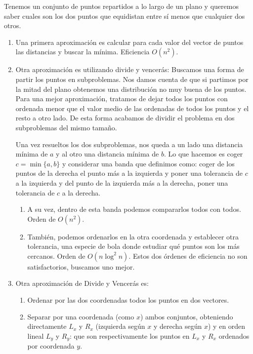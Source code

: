 \begin{ejercicio*}
    Tenemos un conjunto de puntos repartidos a lo largo de un plano y queremos saber cuales son los dos puntos que equidistan entre sí menos que cualquier dos otros.

    \begin{enumerate}
        \item Una primera aproximación es calcular para cada valor del vector de puntos las distancias y buscar la mínima. Eficiencia $O(n^2)$.
        \item Otra aproximación es utilizando divide y vencerás: Buscamos una forma de partir los puntos en subproblemas. Nos damos cuenta de que si partimos por la mitad del plano obtenemos una distribución no muy buena de los puntos. Para una mejor aproximación, tratamos de dejar todos los puntos con ordenada menor que el valor medio de las ordenadas de todos los puntos y el resto a otro lado. De esta forma acabamos de dividir el problema en dos subproblemas del mismo tamaño. 

            Una vez resueltos los dos subproblemas, nos queda a un lado una distancia mínima de $a$ y al otro una distancia mínima de $b$. Lo que hacemos es coger $c = \min\{a, b\}$ y considerar una banda que definimos como: coger de los puntos de la derecha el punto más a la izquierda y poner una tolerancia de $c$ a la izquierda y del punto de la izquierda más a la derecha, poner una tolerancia de $c$ a la derecha.

        \begin{enumerate}
            \item A su vez, dentro de esta banda podemos compararlos todos con todos. Orden de $O(n^2)$.
            \item También, podemos ordenarlos en la otra coordenada y establecer otra tolerancia, una especie de bola donde estudiar qué puntos son los más cercanos. Orden de $O(n\log^2 n)$.
                Estos dos órdenes de eficiencia no son satisfactorios, buscamos uno mejor.
        \end{enumerate}
        \item Otra aproximación de Divide y Vencerás es:
            \begin{enumerate}
                \item Ordenar por las dos coordenadas todos los puntos en dos vectores. 
                \item Separar por una coordenada (como $x$) ambos conjuntos, obteniendo directamente $L_x$ y $R_x$ (izquierda según $x$ y derecha según $x$) y en orden lineal $L_y$ y $R_y$: que son respectivamente los puntos en $L_x$ y $R_x$ ordenados por coordenada $y$.
            \end{enumerate}
        \end{enumerate}
\end{ejercicio*}

